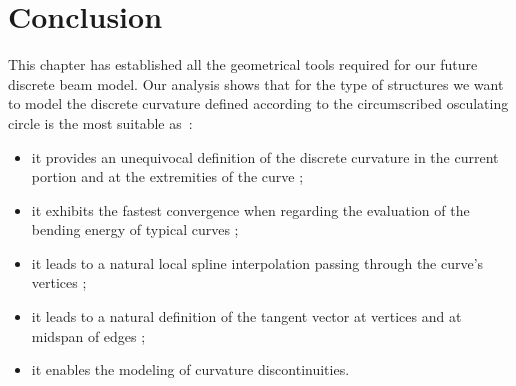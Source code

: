 \section{Conclusion}

This chapter has established all the geometrical tools required for our future discrete beam model. Our analysis shows that for the type of structures we want to model the discrete curvature defined according to the circumscribed osculating circle is the most suitable as~: 
\begin{itemize}
\item it provides an unequivocal definition of the discrete curvature in the current portion and at the extremities of the curve ;
\item it exhibits the fastest convergence when regarding the evaluation of the bending energy of typical curves ;
\item it leads to a natural local spline interpolation passing through the curve's vertices ;
\item it leads to a natural definition of the tangent vector at vertices and at midspan of edges ;
\item it enables the modeling of curvature discontinuities.
\end{itemize}


